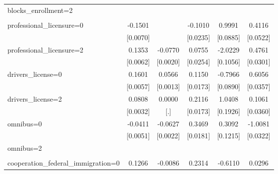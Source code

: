 \begin{table}[htbp]
\begin{tabular}{l*{5}{c}}
\addlinespace
blocks\_enrollment=2 &                     &                     &                     &                     &                     \\
                    &                     &                     &                     &                     &                     \\
\addlinespace
professional\_licensure=0&     -0.1501\sym{***}&                     &     -0.1010\sym{***}&      0.9991\sym{***}&      0.4116\sym{***}\\
                    &    [0.0070]         &                     &    [0.0235]         &    [0.0885]         &    [0.0522]         \\
\addlinespace
professional\_licensure=2&      0.1353\sym{***}&     -0.0770\sym{***}&      0.0755\sym{***}&     -2.0229\sym{***}&      0.4761\sym{***}\\
                    &    [0.0062]         &    [0.0020]         &    [0.0254]         &    [0.1056]         &    [0.0301]         \\
\addlinespace
drivers\_license=0   &      0.1601\sym{***}&      0.0566\sym{***}&      0.1150\sym{***}&     -0.7966\sym{***}&      0.6056\sym{***}\\
                    &    [0.0057]         &    [0.0013]         &    [0.0173]         &    [0.0890]         &    [0.0357]         \\
\addlinespace
drivers\_license=2   &      0.0808\sym{***}&      0.0000         &      0.2116\sym{***}&      1.0408\sym{***}&      0.1061\sym{***}\\
                    &    [0.0032]         &         [.]         &    [0.0173]         &    [0.1926]         &    [0.0360]         \\
\addlinespace
omnibus=0           &     -0.0411\sym{***}&     -0.0627\sym{***}&      0.3469\sym{***}&      0.3092\sym{**} &     -1.0081\sym{***}\\
                    &    [0.0051]         &    [0.0022]         &    [0.0181]         &    [0.1215]         &    [0.0322]         \\
\addlinespace
omnibus=2           &                     &                     &                     &                     &                     \\
                    &                     &                     &                     &                     &                     \\
\addlinespace
cooperation\_federal\_immigration=0&      0.1266\sym{***}&     -0.0086\sym{***}&      0.2314\sym{***}&     -0.6110\sym{***}&      0.0296         \\

\end{tabular}
\end{table}
